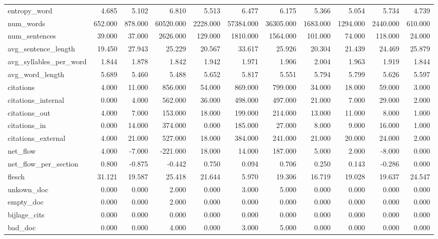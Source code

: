 \begin{tabular}{lrrrrrrrrrr}
\cline{1-11}
entropy\_word & 4.685 & 5.102 & 6.810 & 5.513 & 6.477 & 6.175 & 5.366 & 5.054 & 5.734 & 4.739 \\
\cline{1-11}
num\_words & 652.000 & 878.000 & 60520.000 & 2228.000 & 57384.000 & 36305.000 & 1683.000 & 1294.000 & 2440.000 & 610.000 \\
\cline{1-11}
num\_sentences & 39.000 & 37.000 & 2626.000 & 129.000 & 1810.000 & 1564.000 & 101.000 & 74.000 & 118.000 & 24.000 \\
\cline{1-11}
avg\_sentence\_length & 19.450 & 27.943 & 25.229 & 20.567 & 33.617 & 25.926 & 20.304 & 21.439 & 24.469 & 25.879 \\
\cline{1-11}
avg\_syllables\_per\_word & 1.844 & 1.878 & 1.842 & 1.942 & 1.971 & 1.906 & 2.004 & 1.963 & 1.919 & 1.844 \\
\cline{1-11}
avg\_word\_length & 5.689 & 5.460 & 5.488 & 5.652 & 5.817 & 5.551 & 5.794 & 5.799 & 5.626 & 5.597 \\
\cline{1-11}
citations & 4.000 & 11.000 & 856.000 & 54.000 & 869.000 & 799.000 & 34.000 & 18.000 & 59.000 & 3.000 \\
\cline{1-11}
citations\_internal & 0.000 & 4.000 & 562.000 & 36.000 & 498.000 & 497.000 & 21.000 & 7.000 & 29.000 & 2.000 \\
\cline{1-11}
citations\_out & 4.000 & 7.000 & 153.000 & 18.000 & 199.000 & 214.000 & 13.000 & 11.000 & 8.000 & 1.000 \\
\cline{1-11}
citations\_in & 0.000 & 14.000 & 374.000 & 0.000 & 185.000 & 27.000 & 8.000 & 9.000 & 16.000 & 1.000 \\
\cline{1-11}
citations\_external & 4.000 & 21.000 & 527.000 & 18.000 & 384.000 & 241.000 & 21.000 & 20.000 & 24.000 & 2.000 \\
\cline{1-11}
net\_flow & 4.000 & -7.000 & -221.000 & 18.000 & 14.000 & 187.000 & 5.000 & 2.000 & -8.000 & 0.000 \\
\cline{1-11}
net\_flow\_per\_section & 0.800 & -0.875 & -0.442 & 0.750 & 0.094 & 0.706 & 0.250 & 0.143 & -0.286 & 0.000 \\
\cline{1-11}
flesch & 31.121 & 19.587 & 25.418 & 21.644 & 5.970 & 19.306 & 16.719 & 19.028 & 19.637 & 24.547 \\
\cline{1-11}
unkown\_doc & 0.000 & 0.000 & 2.000 & 0.000 & 3.000 & 5.000 & 0.000 & 0.000 & 0.000 & 0.000 \\
\cline{1-11}
empty\_doc & 0.000 & 0.000 & 2.000 & 0.000 & 0.000 & 0.000 & 0.000 & 0.000 & 0.000 & 0.000 \\
\cline{1-11}
bijlage\_cits & 0.000 & 0.000 & 0.000 & 0.000 & 0.000 & 0.000 & 0.000 & 0.000 & 0.000 & 0.000 \\
\cline{1-11}
bad\_doc & 0.000 & 0.000 & 4.000 & 0.000 & 3.000 & 5.000 & 0.000 & 0.000 & 0.000 & 0.000 \\
\cline{1-11}
\bottomrule
\end{tabular}
